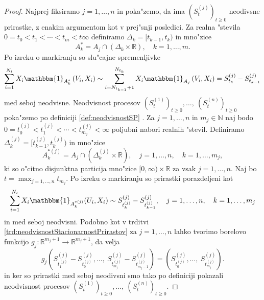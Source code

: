 \documentclass[12pt, a4paper, reqno]{amsart}
\theoremstyle{definition}
\theoremstyle{plain}
\newcommand{\R}{\mathbb{R}}
\newcommand{\N}{\mathbb{N}}
\newcommand{\1}{\mathds{1}}
\newcommand*{\refPriloga}[1]{%
  \begingroup
    \hypersetup{
      linkcolor=properpurple,
      linkbordercolor=properpurple,
    }%
    \ref{#1}%
  \endgroup
}
\begin{document}
        \begin{proof}
            Najprej fiksiramo $j=1, \dots, n$ in poka"zemo, da ima $(S_t^{(j)})_{t\geq0}$   neodivsne prirastke, z 
            enakim argumentom kot v prej"snji posledici. 
            Za realna "stevila $0 = t_0 < t_1 < \cdots < t_m < t \infty$ definiramo $\Delta_k = [t_{k-1}, t_k)$ in 
            mno"zice 
            \begin{equation*}
                A_k^* = A_j \cap \left(\Delta_k \times \R\right), \quad k = 1, \dots, m.
            \end{equation*}
            Po izreku o markiranju so slu"cajne spremenljivke 
            \begin{equation*}
                \sum_{i = 1}^{N_{t}}X_i\mathbbm{1}_{A_k^*}\left(V_i, X_i\right) \sim \sum_{i = N_{t_{k-1}}+1}^{N_{t_k}}X_i\mathbbm{1}_{A_j}\left(V_i, X_i\right) = S_{t_k}^{(j)} - S_{t_{k-1}}^{(j)}
            \end{equation*}
            med seboj neodvisne.
            Neodvisnost procesov $(S_t^{(1)})_{t\geq0}, \dots, \ (S_t^{(n)})_{t\geq0}$ poka"zemo po definiciji
            \refPriloga{def:neodvisnostSP}. Za $j=1, \dots, n$ in $m_j\in\N$ naj bodo $0 = t_0^{(j)} < t_1^{(j)} < \cdots < t^{(j)}_{m_j} < \infty$ 
            poljubni nabori realnih "stevil. Definiramo $\Delta^{(j)}_k = [t^{(j)}_{k-1}, t^{(j)}_k)$ in mno"zice
            \begin{equation*}
                A_k^{*(j)} = A_j \cap \left(\Delta_k^{(j)} \times \R\right), \quad j = 1, \dots, n, \quad k = 1, \dots, m_j,
            \end{equation*}
            ki so o"citno disjunktna particija mno"zice $[0, \infty)\times \R$ za vsak
            $j = 1, \dots, n$. Naj bo $t = \max_{j = 1, \dots, n}t_{m_j}$. Po izreku o markiranju 
            so prirastki porazdeljeni kot
            \begin{equation*}
                \sum_{i = 1}^{N_t} X_i\mathbbm{1}_{A_k^{*(j)}}(U_i, X_i) \sim 
                S_{t_k^{(j)}}^{(j)} - S_{t_{k-1}^{(j)}}^{(j)}, \quad j = 1, \dots, n, \quad k = 1, \dots, m_j
            \end{equation*}
            in med seboj neodvisni. Podobno kot v trditvi \ref{trd:neodvisnostStacionarnostPrirastov} za 
            $j=1, \dots, n$ lahko tvorimo 
            borelovo funkcijo $g_j:\R^{m_j + 1}\to\R^{m_j + 1}$, da velja 
            \begin{equation*}
                g_j\left(S_{t_1^{(j)}}^{(j)} - S_{t_0^{(j)}}^{(j)}, \dots, \ S_{t_{m_j}^{(j)}}^{(j)} - S_{t_{m_j - 1}^{(j)}}^{(j)}\right) = 
                \left(S_{t_0^{(j)}}^{(j)}, \dots, \ S_{t_{m_j}^{(j)}}^{(j)}\right).
            \end{equation*}
            in ker so prirastki med seboj neodivsni smo tako 
            po definiciji pokazali neodvisnost 
            procesov $(S_t^{(1)})_{t\geq0}, \dots, \ (S_t^{(n)})_{t\geq0}$.
        \end{proof}
    
\end{document}
